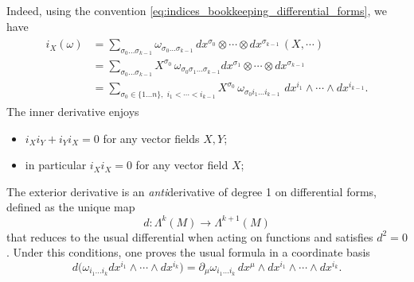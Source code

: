 \documentclass[../geometry_main.tex]{subfiles}
\begin{document}
\begin{mytheorem}
Indeed, using the convention \eqref{eq:indices_bookkeeping_differential_forms}, we have
{\small\begin{align}
\begin{aligned}
    i_X(\omega) &= \sum_{\sigma_0 \dots \sigma_{k-1}} \omega_{\sigma_0 \dots \sigma_{k-1}}\, dx^{\sigma_0}\otimes \cdots \otimes dx^{\sigma_{k-1}}\, (X, \cdots)
    \\
    &= \sum_{\sigma_0 \dots \sigma_{k-1}} X^{\sigma_0} \, \omega_{\sigma_0 \sigma_1 \dots \sigma_{k-1}}dx^{\sigma_1}\otimes \cdots \otimes dx^{\sigma_{k-1}}
    \\
    &= \sum_{\sigma_0 \in\{1\dots n\},\,\,i_1 < \cdots < i_{k-1}} X^{\sigma_0} \, \omega_{\sigma_0 i_1 \dots i_{k-1}}\,\,dx^{i_1}\wedge\cdots \wedge dx^{i_{k-1}}.
\end{aligned}
\end{align}}
The inner derivative enjoys
\begin{itemize}
    \item $i_X i_Y + i_Y i_X = 0$ for any vector fields $X,Y$;
    \item in particular $i_X i_X = 0$ for any vector field $X$;
\end{itemize}
%
\end{mytheorem}


\begin{mytheorem}
The exterior derivative is an \emph{anti}derivative of degree 1 on differential forms, defined as the unique map
\begin{equation}
    d: \Lambda^k (M) \to \Lambda^{k+1} (M)
\end{equation}
that reduces to the usual differential when acting on functions and satisfies $d^2 = 0$.
Under this conditions, one proves the usual formula in a coordinate basis
\begin{equation}\label{eq:exterior_deriv_basis_expr}
    d \Big(\omega_{i_1 \dots i_k} dx^{i_1} \wedge \cdots \wedge dx^{i_k}\Big) = \partial_\mu \omega_{i_1 \dots i_k} \, dx^{\mu} \wedge dx^{i_1} \wedge \cdots \wedge dx^{i_k}.
\end{equation}
\end{mytheorem}
\end{document}
